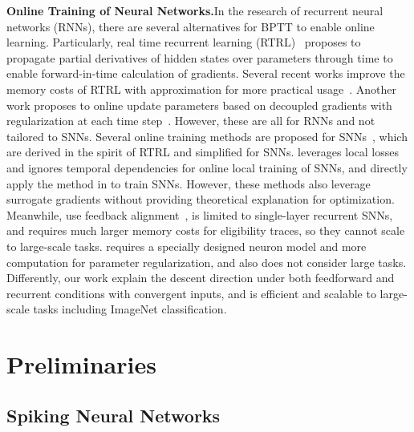 \documentclass{article}
\begin{document}
\textbf{Online Training of Neural Networks.}\quad In the research of recurrent neural networks (RNNs), there are several alternatives for BPTT to enable online learning. Particularly, real time recurrent learning (RTRL)~\cite{williams1989learning} proposes to propagate partial derivatives of hidden states over parameters through time to enable forward-in-time calculation of gradients. Several recent works improve the memory costs of RTRL with approximation for more practical usage~\cite{tallec2018unbiased,mujika2018approximating,menick2020practical}. Another work proposes to online update parameters based on decoupled gradients with regularization at each time step~\cite{kag2021training}. However, these are all for RNNs and not tailored to SNNs. Several online training methods are proposed for SNNs~\cite{zenke2018superspike,bellec2020solution,bohnstingl2022online}, which are derived in the spirit of RTRL and simplified for SNNs. \cite{kaiser2020synaptic} leverages local losses and ignores temporal dependencies for online local training of SNNs, and \cite{yin2021accurate} directly apply the method in \cite{kag2021training} to train SNNs. However, these methods also leverage surrogate gradients without providing theoretical explanation for optimization. Meanwhile, \cite{zenke2018superspike,kaiser2020synaptic} use feedback alignment~\cite{nokland2016direct}, \cite{bellec2020solution} is limited to single-layer recurrent SNNs, and \cite{bohnstingl2022online} requires much larger memory costs for eligibility traces, so they cannot scale to large-scale tasks. \cite{yin2021accurate} requires a specially designed neuron model and more computation for parameter regularization, and also does not consider large tasks. 
Differently, our work explain the descent direction under both feedforward and recurrent conditions with convergent inputs, and is efficient and scalable to large-scale tasks including ImageNet classification.


\vspace{-1mm}
\section{Preliminaries}
\vspace{-2mm}

\subsection{Spiking Neural Networks}
\vspace{-2mm}
\end{document}
